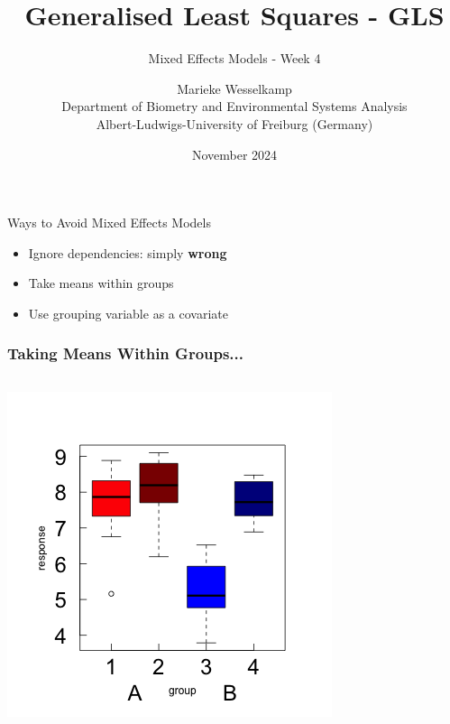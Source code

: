 \documentclass{beamer}
\title{Generalised Least Squares - GLS}
\subtitle{Mixed Effects Models - Week 4}
\author{Marieke Wesselkamp\\Department of Biometry and Environmental Systems Analysis\\Albert-Ludwigs-University of Freiburg (Germany)}
\date{November 2024}
\newenvironment{VerbatimIN}
 {\VerbatimEnvironment
  \begin{tcolorbox}[
    breakable,
    colback=lightgray,
    spartan
  ]%
  \begin{Verbatim}}
 {\end{Verbatim}\end{tcolorbox}}
\begin{document}
\begin{frame}
  \titlepage
\end{frame}

\begin{frame}{Ways to Avoid Mixed Effects Models}
  \begin{itemize}
    \Large 
    \item Ignore dependencies: simply \textbf{wrong}
    \item Take means within groups
    \item Use grouping variable as a covariate
  \end{itemize}
\end{frame}

\begin{frame}[fragile]
\frametitle{Taking Means Within Groups...}
\begin{columns}
    \begin{column}{0.45\textwidth}
        \includegraphics[width=\textwidth]{lectures/day_4_GLS/figures/unnamed-chunk-3-1.png}
    \end{column}
\end{columns}
\end{frame}
\end{document}
